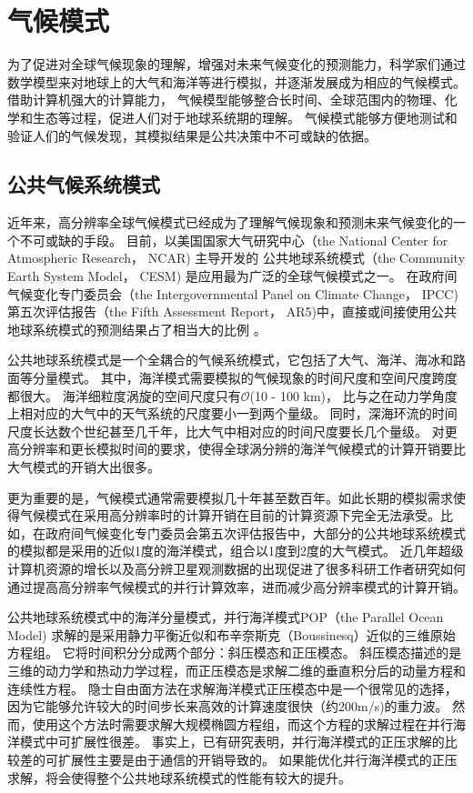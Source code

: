  
\section{气候模式}

为了促进对全球气候现象的理解，增强对未来气候变化的预测能力，科学家们通过数学模型来对地球上的大气和海洋等进行模拟，并逐渐发展成为相应的气候模式。
借助计算机强大的计算能力， 气候模型能够整合长时间、全球范围内的物理、化学和生态等过程，促进人们对于地球系统期的理解\cite{hurrell2013community}。
气候模式能够方便地测试和验证人们的气候发现，其模拟结果是公共决策中不可或缺的依据。
\subsection{公共气候系统模式}
 
 
近年来，高分辨率全球气候模式已经成为了理解气候现象和预测未来气候变化的一个不可或缺的手段。 
目前，以美国国家大气研究中心（the National Center for Atmospheric Research， NCAR) 主导开发的
公共地球系统模式（the Community Earth System Model， CESM) 是应用最为广泛的全球气候模式之一。
在政府间气候变化专门委员会（the
Intergovernmental Panel on Climate Change， IPCC) 第五次评估报告（the Fifth Assessment
Report， AR5)中，直接或间接使用公共地球系统模式的预测结果占了相当大的比例 \cite{stocker2013ipcc}。
 

公共地球系统模式是一个全耦合的气候系统模式，它包括了大气、海洋、海冰和路面等分量模式。
其中，海洋模式需要模拟的气候现象的时间尺度和空间尺度跨度都很大。 
海洋细粒度涡旋的空间尺度只有$\mathcal{O}$(10 - 100 km)， 比与之在动力学角度上相对应的大气中的天气系统的尺度要小一到两个量级。
同时，深海环流的时间尺度长达数个世纪甚至几千年，比大气中相对应的时间尺度要长几个量级。
对更高分辨率和更长模拟时间的要求，使得全球涡分辨的海洋气候模式的计算开销要比大气模式的开销大出很多\cite{bryan2010frontal,mcclean2011prototype,graham2014importance}。


更为重要的是，气候模式通常需要模拟几十年甚至数百年。如此长期的模拟需求使得气候模式在采用高分辨率时的计算开销在目前的计算资源下完全无法承受。比如，在政府间气候变化专门委员会第五次评估报告中，大部分的公共地球系统模式的模拟都是采用的近似1度的海洋模式，组合以1度到2度的大气模式。
近几年超级计算机资源的增长以及高分辨卫星观测数据的出现促进了很多科研工作者研究如何通过提高高分辨率气候模式的并行计算效率，进而减少高分辨率模式的计算开销。


公共地球系统模式中的海洋分量模式，并行海洋模式POP（the Parallel Ocean Model) 求解的是采用静力平衡近似和布辛奈斯克（Boussinesq）近似的三维原始方程组。 
它将时间积分分成两个部分：斜压模态和正压模态。 
斜压模态描述的是三维的动力学和热动力学过程，而正压模态是求解二维的垂直积分后的动量方程和连续性方程。
隐士自由面方法在求解海洋模式正压模态中是一个很常见的选择，因为它能够允许较大的时间步长来高效的计算速度很快（约200m/s)的重力波。
然而，使用这个方法时需要求解大规模椭圆方程组，而这个方程的求解过程在并行海洋模式中可扩展性很差。
事实上，已有研究表明，并行海洋模式的正压求解的比较差的可扩展性主要是由于通信的开销导致的\cite{Worley:2011:PCE:2063384.2063457}。 
如果能优化并行海洋模式的正压求解，将会使得整个公共地球系统模式的性能有较大的提升\cite{dennis2012computational}。 

